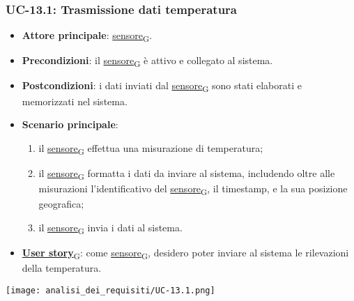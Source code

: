 \newpage 

\subsubsection{UC-13.1: Trasmissione dati temperatura}
\begin{itemize}
	\item \textbf{Attore principale}: \href{https://7last.github.io/docs/rtb/documentazione-interna/glossario\#sensore}{sensore\textsubscript{G}}.
	\item \textbf{Precondizioni}: il \href{https://7last.github.io/docs/rtb/documentazione-interna/glossario\#sensore}{sensore\textsubscript{G}} è attivo e collegato al sistema.
	\item \textbf{Postcondizioni}: i dati inviati dal \href{https://7last.github.io/docs/rtb/documentazione-interna/glossario\#sensore}{sensore\textsubscript{G}} sono stati elaborati e memorizzati nel sistema.
	\item \textbf{Scenario principale}:
	      \begin{enumerate}
		      \item il \href{https://7last.github.io/docs/rtb/documentazione-interna/glossario\#sensore}{sensore\textsubscript{G}} effettua una misurazione di temperatura;
		      \item il \href{https://7last.github.io/docs/rtb/documentazione-interna/glossario\#sensore}{sensore\textsubscript{G}} formatta i dati da inviare al sistema, includendo oltre alle misurazioni l'identificativo del \href{https://7last.github.io/docs/rtb/documentazione-interna/glossario\#sensore}{sensore\textsubscript{G}},
		            il timestamp, e la sua posizione geografica;
		      \item il \href{https://7last.github.io/docs/rtb/documentazione-interna/glossario\#sensore}{sensore\textsubscript{G}} invia i dati al sistema.
	      \end{enumerate}
	\item \href{https://7last.github.io/docs/rtb/documentazione-interna/glossario\#user-story}{\textbf{User story}\textsubscript{G}}: come \href{https://7last.github.io/docs/rtb/documentazione-interna/glossario\#sensore}{sensore\textsubscript{G}}, desidero poter inviare al sistema le rilevazioni della temperatura.
\end{itemize}

\begin{center}
	\texttt{[image: analisi\_dei\_requisiti/UC-13.1.png]}
\end{center}

